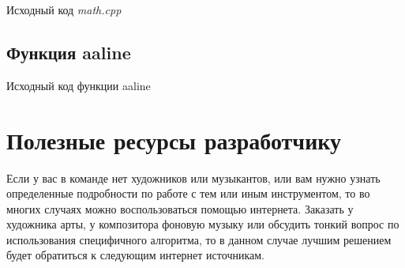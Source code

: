 \pagebreak

\begin{center}
    Исходный код \emph{math.cpp}
\end{center}


\pagebreak

\subsection{Функция aaline}
\label{code:aaline}
\begin{center}
    Исходный код функции aaline
\end{center}


\pagebreak

\section{Полезные ресурсы разработчику}
Если у вас в команде нет художников или музыкантов, или вам нужно узнать определенные подробности по работе 
с тем или иным инструментом, то во многих случаях можно воспользоваться помощью интернета. Заказать у 
художника арты, у композитора фоновую музыку или обсудить тонкий вопрос по использования специфичного 
алгоритма, то в данном случае лучшим решением будет обратиться к следующим интернет источникам.

